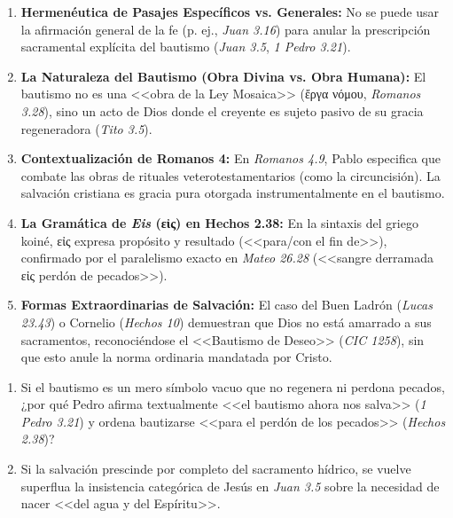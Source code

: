 \documentclass[12pt]{report}
\begin{document}
	\begin{bloque}[Respuesta]
		\begin{enumerate}
			\item \textbf{Hermenéutica de Pasajes Específicos vs. Generales:} No se puede usar la afirmación general de la fe (p. ej., \textit{Juan 3.16}) para anular la prescripción sacramental explícita del bautismo (\textit{Juan 3.5}, \textit{1 Pedro 3.21}).
			
			\item \textbf{La Naturaleza del Bautismo (Obra Divina vs. Obra Humana):} El bautismo no es una <<obra de la Ley Mosaica>> (\textgreek{ἔργα νόμου}, \textit{Romanos 3.28}), sino un acto de Dios donde el creyente es sujeto pasivo de su gracia regeneradora (\textit{Tito 3.5}).
			
			\item \textbf{Contextualización de Romanos 4:} En \textit{Romanos 4.9}, Pablo especifica que combate las obras de rituales veterotestamentarios (como la circuncisión). La salvación cristiana es gracia pura otorgada instrumentalmente en el bautismo.
			
			\item \textbf{La Gramática de \textit{Eis} (\textgreek{εἰς}) en Hechos 2.38:} En la sintaxis del griego koiné, \textgreek{εἰς} expresa propósito y resultado (<<para/con el fin de>>), confirmado por el paralelismo exacto en \textit{Mateo 26.28} (<<sangre derramada \textgreek{εἰς} perdón de pecados>>).
			
			\item \textbf{Formas Extraordinarias de Salvación:} El caso del Buen Ladrón (\textit{Lucas 23.43}) o Cornelio (\textit{Hechos 10}) demuestran que Dios no está amarrado a sus sacramentos, reconociéndose el <<Bautismo de Deseo>> (\textit{CIC 1258}), sin que esto anule la norma ordinaria mandatada por Cristo.
		\end{enumerate}
	\end{bloque}
	
	\begin{minibloque}
		\begin{enumerate}
			\item Si el bautismo es un mero símbolo vacuo que no regenera ni perdona pecados, ¿por qué Pedro afirma textualmente <<el bautismo ahora nos salva>> (\textit{1 Pedro 3.21}) y ordena bautizarse <<para el perdón de los pecados>> (\textit{Hechos 2.38})?
			\item Si la salvación prescinde por completo del sacramento hídrico, se vuelve superflua la insistencia categórica de Jesús en \textit{Juan 3.5} sobre la necesidad de nacer <<del agua y del Espíritu>>.
		\end{enumerate}
	\end{minibloque}
	
\end{document}
